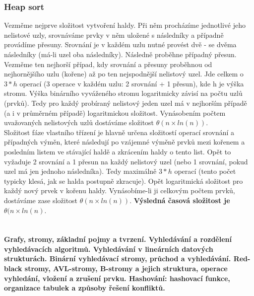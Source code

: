 \documentclass[10pt,a4paper]{article}
\begin{document}
\subsubsection{Heap sort}
Vezměme nejprve složitost vytvoření haldy. Při něm procházíme jednotlivé jeho nelistové uzly, srovnáváme prvky v něm uložené s následníky a případně provádíme přesuny. Srovnání je v každém uzlu nutné provést dvě - se dvěma následníky (má-li uzel oba následníky). Následně proběhne případný přesun. Vezměme ten nejhorší případ, kdy srovnání a přesuny proběhnou od nejhornějšího uzlu (kořene) až po ten nejspodnější nelistový uzel. Jde celkem o $3 \ast h$ operací (3 operace v každém uzlu: 2 srovnání + 1 přesun), kde h je výška stromu. Výška binárního vyváženého stromu logaritmicky závisí na počtu uzlů (prvků). Tedy pro každý probíraný nelistový jeden uzel má v nejhorším případě (a i v průměrném případě) logaritmickou složitost. Vynásobením počtem uvažovaných nelistových uzlů dostáváme složitost $\theta(n\times ln(n))$. \\
Složitost fáze vlastního třízení je hlavně určena složitostí operací srovnání a případných výměn, které následují po vzájemné výměně prvků mezi kořenem a posledním listem ve stávající haldě a zkrácením haldy o tento list. Opět to vyžaduje 2 srovnání a 1 přesun na každý nelistový uzel (nebo 1 srovnání, pokud uzel má jen jednoho následníka). Tedy maximálně $3\ast h$ operací (tento počet typicky klesá, jak se halda postupně zkracuje). Opět logaritmická složitost pro každý nový prvek v kořenu haldy. Vynásobíme-li ji celkovým počtem prvků, dostáváme zase složitost $\theta(n\times ln(n))$. \textbf{Výsledná časová složitost je} $\theta (n \times ln(n)$.




\newpage

\section{}
\paragraph{Grafy, stromy, základní pojmy a tvrzení. Vyhledávání a rozdělení vyhledávacích algoritmů. Vyhledávání v lineárních datových strukturách. Binární vyhledávací stromy, průchod a vyhledávání. Red-black stromy, AVL-stromy, B-stromy a jejich struktura, operace vyhledání, vložení a zrušení prvku. Hashování: hashovací funkce, organizace tabulek a způsoby řešení konfliktů.}
\end{document}
